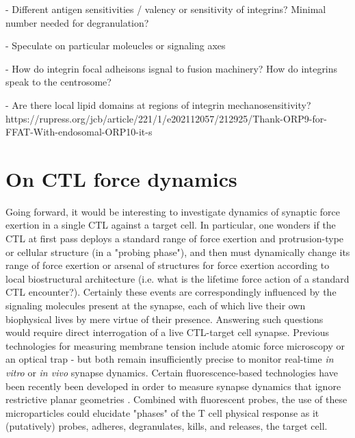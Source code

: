 - Different antigen sensitivities / valency or sensitivity of integrins? Minimal number needed for degranulation?

- Speculate on particular moleucles or signaling axes

- How do integrin focal adheisons isgnal to fusion machinery? How do integrins speak to the centrosome?

- Are there local lipid domains at regions of integrin mechanosensitivity? https://rupress.org/jcb/article/221/1/e202112057/212925/Thank-ORP9-for-FFAT-With-endosomal-ORP10-it-s

\section{On CTL force dynamics}

Going forward, it would be interesting to investigate dynamics of synaptic force exertion in a single CTL against a target cell. In particular, one wonders if the CTL at first pass deploys a standard range of force exertion and protrusion-type or cellular structure (in a "probing phase"), and then must dynamically change its range of force exertion or arsenal of structures for force exertion according to local biostructural architecture (i.e. what is the lifetime force action of a standard CTL encounter?). Certainly these events are correspondingly influenced by the signaling molecules present at the synapse, each of which live their own biophysical lives by mere virtue of their presence. Answering such questions would require direct interrogation of a live CTL-target cell synapse. Previous technologies for measuring membrane tension include atomic force microscopy or an optical trap - but both remain insufficiently precise to monitor real-time \textit{in vitro} or \textit{in vivo} synapse dynamics. Certain fluorescence-based technologies have been recently been developed in order to measure synapse dynamics that ignore restrictive planar geometries \cite{Vorselen2020}. Combined with fluorescent probes, the use of these microparticles could elucidate "phases" of the T cell physical response as it (putatively) probes, adheres, degranulates, kills, and releases, the target cell.

